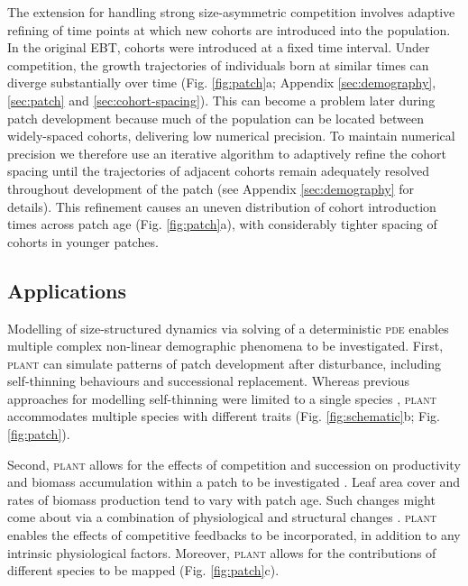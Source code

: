 \documentclass[a4paper,11pt]{article}
\newcommand{\plant}{\textsc{plant}}
\begin{document}
The extension for handling strong size-asymmetric competition involves
adaptive refining of time points at which new cohorts are introduced
into the population. In the original \textsc{EBT}, cohorts were introduced at a
fixed time interval. Under competition, the growth trajectories of
individuals born at similar times can diverge substantially over time
(Fig. \ref{fig:patch}a; Appendix \ref{sec:demography},
\ref{sec:patch} and \ref{sec:cohort-spacing}). This can become a
problem later during patch development because much of the population
can be located between widely-spaced cohorts, delivering low numerical
precision. To maintain numerical precision we therefore use an
iterative algorithm to adaptively refine the cohort spacing until the
trajectories of adjacent cohorts remain adequately resolved throughout
development of the patch (see Appendix \ref{sec:demography} for
details). This refinement causes an uneven distribution of cohort
introduction times across patch age (Fig.  \ref{fig:patch}a), with
considerably tighter spacing of cohorts in younger patches.

\subsection{Applications}

Modelling of size-structured dynamics via solving of a deterministic \textsc{pde}
enables multiple complex non-linear demographic phenomena to be
investigated. First, {\plant} can simulate patterns of patch development after
disturbance, including self-thinning behaviours and successional
replacement. Whereas previous approaches for modelling self-thinning
were limited to a single species
\citep[e.g.][]{Barnes-2004, Coomes-2007}, {\plant} accommodates multiple
 species with different traits (Fig. \ref{fig:schematic}b; Fig.
\ref{fig:patch}).

Second, {\plant} allows for the effects of competition and succession on
productivity and biomass accumulation within a patch to be investigated
\citep{Falster-2011}. Leaf area cover and rates of biomass production
tend to vary with patch age. Such changes might come about via a
combination of physiological and structural changes
\citep{Binkley-2002, Smith-2001, Coomes-2007, Ogawa-2010}. {\plant} enables
the effects of competitive feedbacks to be incorporated, in addition to
any intrinsic physiological factors. Moreover, {\plant} allows for the
contributions of different species to be mapped (Fig. \ref{fig:patch}c).
\end{document}
